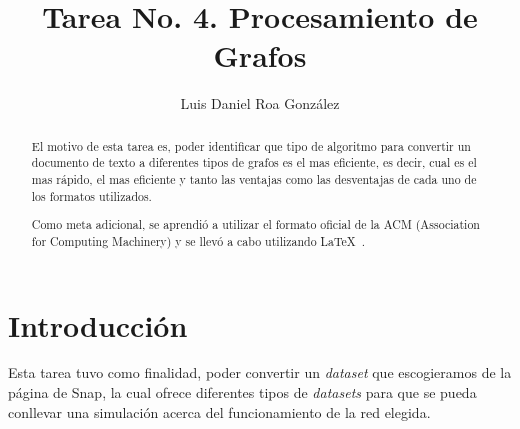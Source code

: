 \documentclass[acmsmall]{acmart}
\begin{document}
\title{Tarea No. 4. Procesamiento de Grafos}

\author{Luis Daniel Roa González}

\begin{abstract}
  El motivo de esta tarea es, poder identificar que tipo de algoritmo para convertir un documento de texto a diferentes tipos de grafos es el mas eficiente, es decir, cual es el mas rápido, el mas eficiente y tanto las ventajas como las desventajas de cada uno de los formatos utilizados. 
  
  Como meta adicional, se aprendió a utilizar el formato oficial de la ACM (Association for Computing Machinery) y se llevó a cabo utilizando \LaTeX\ .
\end{abstract}




\maketitle

\section{Introducción}
Esta tarea tuvo como finalidad, poder convertir un \textit{dataset} que escogieramos de la página de Snap, la cual ofrece diferentes tipos de \textit{datasets} para que se pueda conllevar una simulación acerca del funcionamiento de la red elegida.
\end{document}
